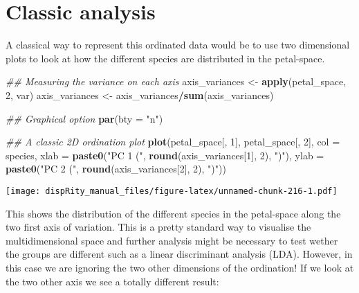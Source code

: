 \documentclass[
]{book}
\newenvironment{Shaded}{\begin{snugshade}}{\end{snugshade}}
\newcommand{\CommentTok}[1]{\textcolor[rgb]{0.56,0.35,0.01}{\textit{#1}}}
\newcommand{\DataTypeTok}[1]{\textcolor[rgb]{0.13,0.29,0.53}{#1}}
\newcommand{\DecValTok}[1]{\textcolor[rgb]{0.00,0.00,0.81}{#1}}
\newcommand{\KeywordTok}[1]{\textcolor[rgb]{0.13,0.29,0.53}{\textbf{#1}}}
\newcommand{\NormalTok}[1]{#1}
\newcommand{\OperatorTok}[1]{\textcolor[rgb]{0.81,0.36,0.00}{\textbf{#1}}}
\newcommand{\StringTok}[1]{\textcolor[rgb]{0.31,0.60,0.02}{#1}}
\begin{document}
\hypertarget{classic-analysis}{%
\section{Classic analysis}\label{classic-analysis}}

A classical way to represent this ordinated data would be to use two dimensional plots to look at how the different species are distributed in the petal-space.

\begin{Shaded}
\begin{Highlighting}[]
\CommentTok{\#\# Measuring the variance on each axis}
\NormalTok{axis\_variances \textless{}{-}}\StringTok{ }\KeywordTok{apply}\NormalTok{(petal\_space, }\DecValTok{2}\NormalTok{, var)}
\NormalTok{axis\_variances \textless{}{-}}\StringTok{ }\NormalTok{axis\_variances}\OperatorTok{/}\KeywordTok{sum}\NormalTok{(axis\_variances)}

\CommentTok{\#\# Graphical option}
\KeywordTok{par}\NormalTok{(}\DataTypeTok{bty =} \StringTok{"n"}\NormalTok{)}

\CommentTok{\#\# A classic 2D ordination plot}
\KeywordTok{plot}\NormalTok{(petal\_space[, }\DecValTok{1}\NormalTok{], petal\_space[, }\DecValTok{2}\NormalTok{], }\DataTypeTok{col =}\NormalTok{ species,}
    \DataTypeTok{xlab =} \KeywordTok{paste0}\NormalTok{(}\StringTok{"PC 1 ("}\NormalTok{, }\KeywordTok{round}\NormalTok{(axis\_variances[}\DecValTok{1}\NormalTok{], }\DecValTok{2}\NormalTok{), }\StringTok{")"}\NormalTok{),}
    \DataTypeTok{ylab =} \KeywordTok{paste0}\NormalTok{(}\StringTok{"PC 2 ("}\NormalTok{, }\KeywordTok{round}\NormalTok{(axis\_variances[}\DecValTok{2}\NormalTok{], }\DecValTok{2}\NormalTok{), }\StringTok{")"}\NormalTok{))}
\end{Highlighting}
\end{Shaded}

\texttt{[image: dispRity\_manual\_files/figure-latex/unnamed-chunk-216-1.pdf]}

This shows the distribution of the different species in the petal-space along the two first axis of variation.
This is a pretty standard way to visualise the multidimensional space and further analysis might be necessary to test wether the groups are different such as a linear discriminant analysis (LDA).
However, in this case we are ignoring the two other dimensions of the ordination!
If we look at the two other axis we see a totally different result:
\end{document}
